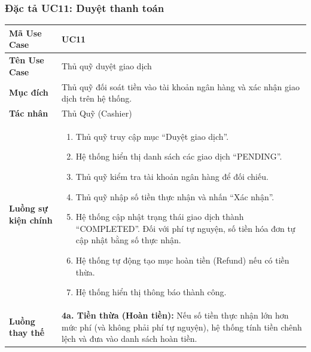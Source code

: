 \documentclass[12pt,a4paper]{article}
\begin{document}
\subsubsection{Đặc tả UC11: Duyệt thanh toán}
\begin{table}[H]
    \centering
    \renewcommand{\arraystretch}{1.2}
    \begin{tabularx}{\textwidth}{|l|X|}
    \hline
    \textbf{Mã Use Case} & \textbf{UC11} \\
    \hline
    \textbf{Tên Use Case} & Thủ quỹ duyệt giao dịch \\
    \hline
    \textbf{Mục đích} & Thủ quỹ đối soát tiền vào tài khoản ngân hàng và xác nhận giao dịch trên hệ thống. \\
    \hline
    \textbf{Tác nhân} & Thủ Quỹ (Cashier) \\
    \hline
    \textbf{Luồng sự kiện chính} &
    \begin{enumerate}
        \item Thủ quỹ truy cập mục ``Duyệt giao dịch''.
        \item Hệ thống hiển thị danh sách các giao dịch ``PENDING''.
        \item Thủ quỹ kiểm tra tài khoản ngân hàng để đối chiếu.
        \item Thủ quỹ nhập số tiền thực nhận và nhấn ``Xác nhận''.
        \item Hệ thống cập nhật trạng thái giao dịch thành ``COMPLETED''. Đối với phí tự nguyện, số tiền hóa đơn tự cập nhật bằng số thực nhận.
        \item Hệ thống tự động tạo mục hoàn tiền (Refund) nếu có tiền thừa.
        \item Hệ thống hiển thị thông báo thành công.
    \end{enumerate} \\
    \hline
    \textbf{Luồng thay thế} &
    \textbf{4a. Tiền thừa (Hoàn tiền):} Nếu số tiền thực nhận lớn hơn mức phí (và không phải phí tự nguyện), hệ thống tính tiền chênh lệch và đưa vào danh sách hoàn tiền. \\
    \hline
    \end{tabularx}
\end{table}

\end{document}
